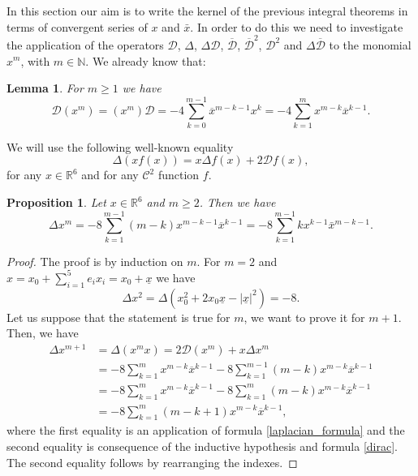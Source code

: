 \documentclass[reqno,11pt]{amsart}
\numberwithin{equation}{section}
\newtheorem{lemma}[theorem]{Lemma}
\newtheorem{proposition}[theorem]{Proposition}
\theoremstyle{definition}
\begin{document}
In this section our aim is to write the kernel of the previous integral theorems in terms of convergent series of $x$ and $\bar{x}$. In order to do this we need to investigate the application of the operators $\mathcal{D}$, $ \Delta$, $\Delta \mathcal{D}$, $\mathcal{\overline{D}}$, $\mathcal{\overline{D}}^2$, $ \mathcal{D}^2$ and $ \Delta \overline{\mathcal{D}}$ to the monomial $x^m$, with $m \in \mathbb{N}$. We already know that:
\begin{lemma}{\cite[Lemma 1]{B} }\label{begher}
For $m \geq 1$ we have
\begin{equation}
\label{dirac}
\mathcal{D}(x^m)=(x^m) \mathcal{D}=-4\sum_{k=0}^{m-1}\overline x^{m-k-1}x^k=-4\sum_{k=1}^m x^{m-k}\overline x^{k-1}.
\end{equation}
\end{lemma}

We will use the following well-known equality
\begin{equation}
\label{laplacian_formula}
\Delta (xf(x))=x\Delta f(x)+2\mathcal{D}f(x),
\end{equation}
for any $x\in\mathbb R^6$ and for any $\mathcal{C}^2$ function $f$.
\begin{proposition}\label{laplacian}
Let $ x \in \mathbb{R}^6$ and $m\geq 2$. Then we have
\begin{equation}
\label{delta}
\Delta x^m=-8\sum_{k=1}^{m-1}(m-k)x^{m-k-1}\overline x^{k-1}=-8\sum_{k=1}^{m-1}k x^{k-1}\bar{x}^{m-k-1}.
\end{equation}

\end{proposition}
\begin{proof}
The proof is by induction on $m$. For $m=2$ and $x=x_0+\sum_{i=1}^5 e_i x_i=x_0+\underline x$ we have
$$\Delta x^2=\Delta (x_0^2+2x_0\underline x-|\underline x|^2)=-8.$$
Let us suppose that the statement is true for $m$, we want to prove it for $m+1$. Then, we have
\[
\begin{split}
\Delta	x^{m+1}	&=\Delta (x^{m} x)=2 \mathcal{D}(x^m)+x\Delta x^m\\
&=-8\sum_{k=1}^m x^{m-k}\overline x^{k-1}-8\sum_{k=1}^{m-1}(m-k)x^{m-k}\overline x^{k-1}\\
&=-8\sum_{k=1}^m x^{m-k}\overline x^{k-1}-8\sum_{k=1}^{m}(m-k)x^{m-k}\overline x^{k-1}\\
&=-8\sum_{k=1}^m (m-k+1)x^{m-k}\overline x^{k-1},
\end{split}
\]
where the first equality is an application of formula \eqref{laplacian_formula} and the second equality is consequence of the inductive hypothesis and formula \eqref{dirac}. The second equality follows by rearranging the indexes.
\end{proof}
\end{document}

